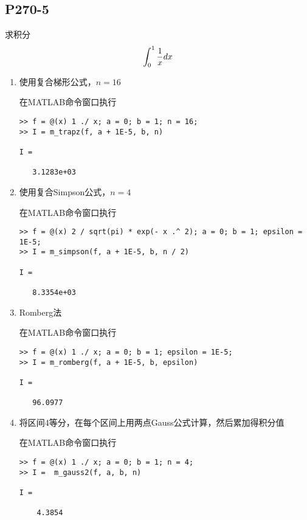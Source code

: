 \subsection{P270-5}

\renewcommand{\FX}{\frac{1}{x}}
\renewcommand{\LRANGE}{0}
\renewcommand{\RRANGE}{1}
\renewcommand{\EPSILON}{{10}^{-5}}

求积分
\begin{displaymath}
\INTRANGE{\FX}{x}
\end{displaymath}

\begin{enumerate}
\item
\renewcommand{\N}{16}
使用复合梯形公式，$n = \N$
\begin{SOLVE}
在MATLAB命令窗口执行
\begin{lstlisting}
>> f = @(x) 1 ./ x; a = 0; b = 1; n = 16;
>> I = m_trapz(f, a + 1E-5, b, n)

I =

   3.1283e+03

\end{lstlisting}
\end{SOLVE}
\item
\renewcommand{\N}{4}
使用复合Simpson公式，$n = \N$
\begin{SOLVE}
在MATLAB命令窗口执行
\begin{lstlisting}
>> f = @(x) 2 / sqrt(pi) * exp(- x .^ 2); a = 0; b = 1; epsilon = 1E-5;
>> I = m_simpson(f, a + 1E-5, b, n / 2)

I =

   8.3354e+03

\end{lstlisting}
\end{SOLVE}
\item
Romberg法
\begin{SOLVE}
在MATLAB命令窗口执行
\begin{lstlisting}
>> f = @(x) 1 ./ x; a = 0; b = 1; epsilon = 1E-5;
>> I = m_romberg(f, a + 1E-5, b, epsilon)

I =

   96.0977

\end{lstlisting}
\end{SOLVE}
\item
将区间4等分，在每个区间上用两点Gauss公式计算，然后累加得积分值
\begin{SOLVE}
在MATLAB命令窗口执行
\begin{lstlisting}
>> f = @(x) 1 ./ x; a = 0; b = 1; n = 4;
>> I =  m_gauss2(f, a, b, n) 

I =

    4.3854

\end{lstlisting}
\end{SOLVE}

\end{enumerate}
